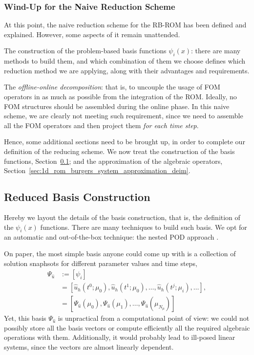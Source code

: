 \documentclass[../../thesis.tex]{subfiles}
\begin{document}
\subsubsection{Wind-Up for the Naive Reduction Scheme}
At this point, the naive reduction scheme for the RB-ROM has been defined and explained.
However, some aspects of it remain unattended.

The construction of the problem-based basis functions $\psi_i(x)$:
there are many methods to build them, and which combination of them we choose 
defines which reduction method we are applying, along with their advantages and requirements.

The \emph{offline-online decomposition}: 
that is, to uncouple the usage of FOM operators in as much as possible from the integration of the ROM. 
Ideally, no FOM structures should be assembled during the online phase.
In this naive scheme, we are clearly not meeting such requirement, since we need to assemble all the FOM operators and then project them \emph{for each time step}.

Hence, some additional sections need to be brought up, in order to complete our definition of the reducing scheme.
We now treat the construction of the basis functions, Section~\ref{sec:1d_rom_burgers_basis_construction}; and the approximation of the algebraic operators, Section~\ref{sec:1d_rom_burgers_system_approximation_deim}.

\subsection{Reduced Basis Construction}
\label{sec:1d_rom_burgers_basis_construction}
Hereby we layout the details of the basis construction, that is, the definition of the $\psi_i(x)$ functions.
There are many techniques to build such basis.
We opt for an automatic and out-of-the-box technique: the nested POD approach
\cite{Santo_Manzoni_2019}. 

On paper, the most simple basis anyone could come up with is 
a collection of solution snaphsots for different parameter values and time steps, 
\begin{align}
    \Psi_{\hat{u}} &:= [\psi_i] \nonumber \\
    &= [\hat{u}_h(t^0; \mu_0), \hat{u}_h(t^1; \mu_0), 
    \ldots, \hat{u}_h(t^j; \mu_i), \ldots], \nonumber \\
    &= [\Psi_{\hat{u}}(\mu_0), \Psi_{\hat{u}}(\mu_1), \ldots, \Psi_{\hat{u}}(\mu_{N_{\mu}})]
\end{align}
Yet, this basis $\Psi_{\hat{u}}$ is unpractical from a computational point of view: we could not possibly store all the basis vectors or compute efficiently all the required algebraic operations with them.
Additionally, it would probably lead to ill-posed linear systems, since the vectors are almost linearly dependent. 
\end{document}
